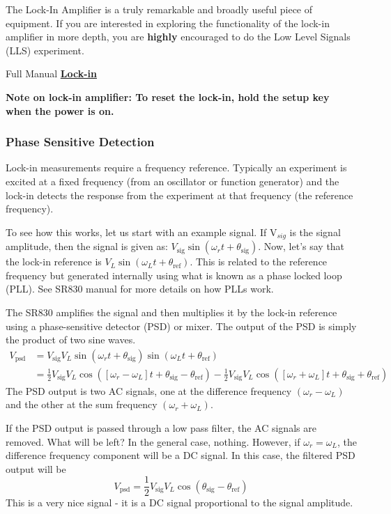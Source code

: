 \documentclass{../lab}
\begin{document}
The Lock-In Amplifier is a truly remarkable and broadly useful piece of equipment. If you are interested in exploring the functionality of the lock-in amplifier in more depth, you are \textbf{highly} encouraged to do the Low Level Signals (LLS) experiment. 

Full Manual \href{https://berkeley-physics111b.github.io/assets/pdf/oldwebsitestructure/General_Equipment/SRS%20SR830_Manual.pdf}{\textbf{Lock-in}}

\textbf{Note on lock-in amplifier: To reset the lock-in, hold the setup key when the power is on.}

\subsubsection{Phase Sensitive Detection}

Lock-in measurements require a frequency reference. Typically an experiment is excited at a fixed frequency (from an oscillator or function generator) and the lock-in detects the response from the experiment at that frequency (the reference frequency).

To see how this works, let us start with an example signal. If V$_{sig}$ is the signal amplitude, then the signal is given as: $V_\text{sig}\sin(\omega_rt + \theta_\text{sig})$. Now, let's say that the lock-in reference is $V_L \sin(\omega_Lt + \theta_\text{ref})$. This is related to the reference frequency but generated internally using what is known as a phase locked loop (PLL). See SR830 manual for more details on how PLLs work. 

The SR830 amplifies the signal and then multiplies it by the lock-in reference using a phase-sensitive detector (PSD) or mixer. The output of the PSD is simply the product of two sine waves.
\begin{align*}
    V_\text{psd} &= V_\text{sig} V_L \sin (\omega_rt + \theta_\text{sig}) \sin (\omega_Lt + \theta_\text{ref}) \\
    &= \frac{1}{2} V_\text{sig} V_L \cos ([\omega_r - \omega_L ]t + \theta_\text{sig} - \theta_\text{ref}) - \frac{1}{2} V_\text{sig} V_L \cos ([\omega_r + \omega_L ]t + \theta_\text{sig} + \theta_\text{ref})
\end{align*}
The PSD output is two AC signals, one at the difference frequency $(\omega_r - \omega_L)$ and the other at the sum frequency $(\omega_r + \omega_L)$.

If the PSD output is passed through a low pass filter, the AC signals are removed. What will be left? In the general case, nothing. However, if $\omega_r = \omega_L$, the difference frequency component will be a DC signal. In this case, the filtered PSD output will be
\[
    V_\text{psd} = \frac{1}{2} V_\text{sig} V_L \cos(\theta_\text{sig} - \theta_\text{ref})
\]
This is a very nice signal - it is a DC signal proportional to the signal amplitude.
\end{document}
